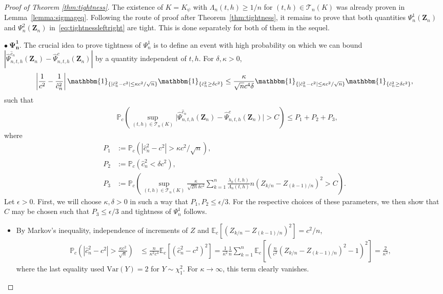 \documentclass[10.5pt,letter]{article}
\numberwithin{equation}{section}
\theoremstyle{definition}
\newcommand{\E}{\mathbb{E}}
\renewcommand{\P}{\mathbb{P}}
\newcommand{\1}{\mathbbm{1}}
\begin{document}
\begin{proof}[Proof of Theorem \ref{thm:tightness}]
The existence of $K=K_\psi$ with $\Lambda_n(t,h)\geq 1/n$ for $(t,h)\in\mathcal{T}_n(K)$ was already proven in Lemma~\ref{lemma:sigmageq}.
Following the route of proof after Theorem~\ref{thm:tightness}, it remains to prove that both quantities $\Psi_n^1(\mathbf{Z}_n)$ and $\Psi_n^2(\mathbf{Z}_n)$ in~\eqref{eq:tightnessleftright} are tight. This is done separately for both of them in the sequel. \smallskip


$\bullet\ \mathbf{\Psi_n^1}$. 
The crucial idea to prove tightness of $\Psi_n^1$ is to define an event with high probability on which we can bound $|\hat{\Psi}_{n,t,h}^{\hat{c}_n}(\mathbf{Z}_n)-\hat{\Psi}_{n,t,h}^{c}(\mathbf{Z}_n) |$ by a quantity independent of $t,h$. For $\delta,\kappa>0$, 
\[ \left| \frac{1}{c^2}-\frac{1}{\hat{c}_n^2}\right|\1_{\{ |\hat{c}_n^2-c^2|\leq \kappa c^2/\sqrt{n}\}} \1_{\{\hat{c}_n^2\geq \delta c^2\}} \leq \frac{\kappa}{\sqrt{n}c^4\delta} \1_{\{ |\hat{c}_n^2-c^2|\leq \kappa c^2/\sqrt{n}\}} \1_{\{\hat{c}_n^2\geq \delta c^2\}},\]
such that
\begin{align*}
    & \P_c\left( \sup_{(t,h) \in \mathcal{T}_n(K)} \big|\hat{\Psi}_{n,t,h}^{\hat{c}_n}(\mathbf{Z}_n) -\hat{\Psi}_{n,t,h}^{c}(\mathbf{Z}_n)\big|>   C\right) 
    \leq P_1+P_2 +P_3,
\end{align*}
where
\begin{align*}
   P_1& := \P_c \left( |\hat{c}_n^2-c^2| > \kappa c^2/\sqrt{n} \right),\\
   P_2&:=  \P_c \left( \hat{c}_n^2< \delta c^2 \right),\\
   P_3&:= \P_c\left( \sup_{(t,h) \in \mathcal{T}_n(K)}  \frac{\kappa}{\sqrt{2n}\delta c^2} \sum_{k=1}^n \frac{\lambda_k(t,h)}{\Lambda_n(t,h)}  n(Z_{k/n}-Z_{(k-1)/n})^2> C\right).
\end{align*}
Let $\epsilon>0$. First, we will choose $\kappa,\delta>0$ in such a way that $P_1,P_2\leq \epsilon/3$. For the respective choices of these parameters, we then show that $C$ may be chosen such that $P_3\leq \epsilon/3$ and tightness of $\Psi_n^1$ follows.\smallskip

\begin{itemize}
    \item[$\bullet\ \mathbf{P_1}$.] By Markov's inequality, independence of increments of $Z$ and $\E_c[(Z_{k/n}-Z_{(k-1)/n})^2]=c^2/n$,
    \begin{align*}
        \P_c \left( |\hat{c}_n^2-c^2| > \frac{\kappa c^2}{\sqrt{n}} \right) &\leq \frac{n}{\kappa^2 c^4}\E_c\left[\left(\hat{c}_n^2-c^2\right)^2\right] = \frac{1}{\kappa^2}\frac1n \sum_{k=1}^n \E_c\left[ \left( \frac{n}{c^2}(Z_{k/n}-Z_{(k-1)/n})^2 -1\right)^2\right] = \frac{2}{\kappa^2},
    \end{align*} 
    where the last equality used $\textrm{Var}(Y)=2$ for $Y\sim\chi_1^2$. For $\kappa\to\infty$, this term clearly vanishes.\smallskip


\end{itemize}
\end{proof}
\end{document}
